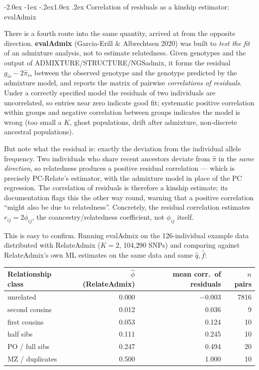 \documentclass[10pt,a4paper]{article}
\makeatletter
\renewcommand\subsection{\@startsection{subsection}{2}{\z@}%
  {-2.0ex \@plus -1ex \@minus -.2ex}{1.0ex \@plus.2ex}%
  {\normalfont\normalsize\bfseries\color{hdr}}}
\makeatother
\begin{document}
\subsection{Correlation of residuals as a kinship estimator: evalAdmix}

There is a fourth route into the same quantity, arrived at from the opposite direction. \textbf{evalAdmix}
(Garcia-Erill \& Albrechtsen 2020) was built to \emph{test the fit} of an admixture analysis, not to estimate
relatedness. Given genotypes and the output of ADMIXTURE/STRUCTURE/NGSadmix, it forms the residual
$g_{is}-2\hat\pi_{is}$ between the observed genotype and the genotype predicted by the admixture model, and
reports the matrix of pairwise \emph{correlations of residuals}. Under a correctly specified model the
residuals of two individuals are uncorrelated, so entries near zero indicate good fit; systematic positive
correlation within groups and negative correlation between groups indicates the model is wrong (too small a
$K$, ghost populations, drift after admixture, non-discrete ancestral populations).

But note what the residual is: exactly the deviation from the individual allele frequency. Two individuals
who share recent ancestors deviate from $\hat\pi$ in the \emph{same direction}, so relatedness produces a
positive residual correlation --- which is precisely PC-Relate's estimator, with the admixture model in place
of the PC regression. The correlation of residuals is therefore a kinship estimate; its documentation
flags this the other way round, warning that a positive correlation ``might also be due to relatedness''.
Concretely, the residual correlation estimates $r_{ij}=2\phi_{ij}$, the coancestry/relatedness coefficient,
not $\phi_{ij}$ itself.

This is easy to confirm. Running evalAdmix on the 126-individual example data distributed with RelateAdmix
($K=2$, 104{,}290 SNPs) and comparing against RelateAdmix's own ML estimates on the same data and same
$\hat q,\hat f$:

\begin{center}
\small
\begin{tabular}{@{}lrrr@{}}
\toprule
Relationship class & $\hat\phi$ (RelateAdmix) & mean corr.\ of residuals & $n$ pairs \\
\midrule
unrelated        & 0.000 & $-0.003$ & 7816 \\
second cousins   & 0.012 & 0.036 & 9 \\
first cousins    & 0.053 & 0.124 & 10 \\
half sibs        & 0.111 & 0.245 & 10 \\
PO / full sibs   & 0.247 & 0.494 & 20 \\
MZ / duplicates  & 0.500 & 1.000 & 10 \\
\bottomrule
\end{tabular}
\end{center}
\end{document}
